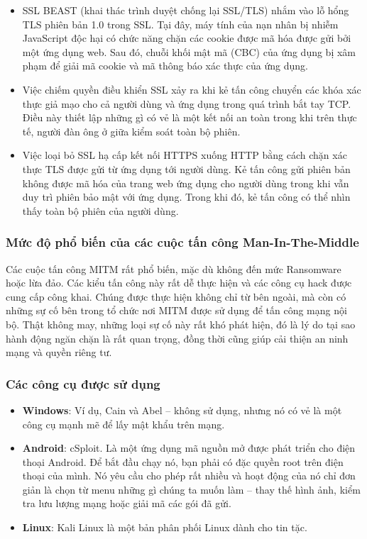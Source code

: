 \begin{itemize}
\begin{itemize}
\item SSL BEAST  (khai thác trình duyệt chống lại SSL/TLS) nhắm vào lỗ hổng TLS phiên bản 1.0 trong SSL. Tại đây, máy tính của nạn nhân bị nhiễm JavaScript độc hại có chức năng chặn các cookie được mã hóa được gửi bởi một ứng dụng web. Sau đó, chuỗi khối mật mã (CBC) của ứng dụng bị xâm phạm để giải mã cookie và mã thông báo xác thực của ứng dụng.

\item Việc chiếm quyền điều khiển SSL  xảy ra khi kẻ tấn công chuyển các khóa xác thực giả mạo cho cả người dùng và ứng dụng trong quá trình bắt tay TCP. Điều này thiết lập những gì có vẻ là một kết nối an toàn trong khi trên thực tế, người đàn ông ở giữa kiểm soát toàn bộ phiên.
\item  Việc loại bỏ SSL  hạ cấp kết nối HTTPS xuống HTTP bằng cách chặn xác thực TLS được gửi từ ứng dụng tới người dùng. Kẻ tấn công gửi phiên bản không được mã hóa của trang web ứng dụng cho người dùng trong khi vẫn duy trì phiên bảo mật với ứng dụng. Trong khi đó, kẻ tấn công có thể nhìn thấy toàn bộ phiên của người dùng.
\end{itemize}
\end{itemize}
\subsubsection{Mức độ phổ biến của các cuộc tấn công Man-In-The-Middle}
Các cuộc tấn công MITM rất phổ biến, mặc dù không đến mức Ransomware hoặc lừa đảo. Các kiểu tấn công này rất dễ thực hiện và các công cụ hack được cung cấp công khai. Chúng được thực hiện không chỉ từ bên ngoài, mà còn có những sự cố bên trong tổ chức nơi MITM được sử dụng để tấn công mạng nội bộ.
\newline
Thật không may, những loại sự cố này rất khó phát hiện, đó là lý do tại sao hành động ngăn chặn là rất quan trọng, đồng thời cũng giúp cải thiện an ninh mạng và quyền riêng tư.

\subsubsection{Các công cụ được sử dụng }
\begin{itemize}
    \item \textbf{Windows}: Ví dụ, Cain và Abel – không sử dụng, nhưng nó có vẻ là một công cụ mạnh mẽ để lấy mật khẩu trên mạng.
    \item \textbf{Android}: cSploit. Là một ứng dụng mã nguồn mở được phát triển cho điện thoại Android. Để bắt đầu chạy nó, bạn phải có đặc quyền root trên điện thoại của mình. Nó yêu cầu cho phép rất nhiều và hoạt động của nó chỉ đơn giản là chọn từ menu những gì chúng ta muốn làm – thay thế hình ảnh, kiểm tra lưu lượng mạng hoặc giải mã các gói đã gửi.
    \item \textbf{Linux}: Kali Linux là một bản phân phối Linux dành cho tin tặc.
\end{itemize}
